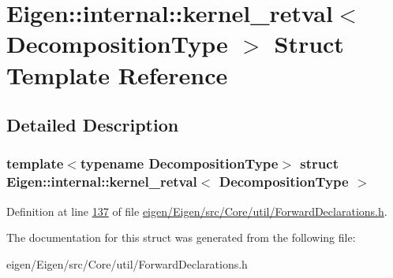 \hypertarget{struct_eigen_1_1internal_1_1kernel__retval}{}\section{Eigen\+:\+:internal\+:\+:kernel\+\_\+retval$<$ Decomposition\+Type $>$ Struct Template Reference}
\label{struct_eigen_1_1internal_1_1kernel__retval}


\subsection{Detailed Description}
\subsubsection*{template$<$typename Decomposition\+Type$>$\newline
struct Eigen\+::internal\+::kernel\+\_\+retval$<$ Decomposition\+Type $>$}



Definition at line \hyperlink{eigen_2_eigen_2src_2_core_2util_2_forward_declarations_8h_source_l00137}{137} of file \hyperlink{eigen_2_eigen_2src_2_core_2util_2_forward_declarations_8h_source}{eigen/\+Eigen/src/\+Core/util/\+Forward\+Declarations.\+h}.



The documentation for this struct was generated from the following file\+:\begin{DoxyCompactItemize}
\item 
eigen/\+Eigen/src/\+Core/util/\+Forward\+Declarations.\+h\end{DoxyCompactItemize}
